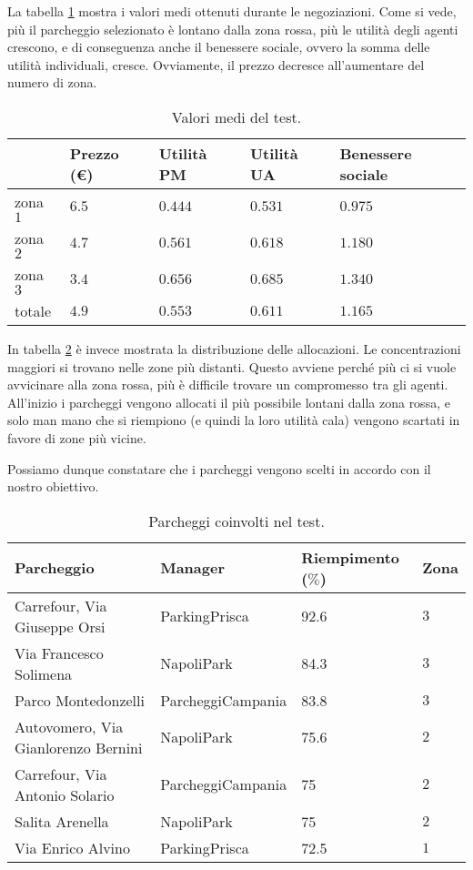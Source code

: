 \documentclass[11pt,a4paper,twoside]{article}
\numberwithin{figure}{section}
\numberwithin{equation}{section}
\begin{document}
La tabella \ref{tab:1} mostra i valori medi ottenuti durante le negoziazioni.
Come si vede, più il parcheggio selezionato è lontano dalla zona rossa, più le utilità degli agenti crescono, e di conseguenza anche il benessere sociale, ovvero la somma delle utilità individuali, cresce.
Ovviamente, il prezzo decresce all'aumentare del numero di zona.

\begin{table}[ht]
    \centering
    \begin{tabular}{lllll}
    \arrayrulecolor{gray}
    \toprule
    & Prezzo (€) & Utilità PM & Utilità UA & Benessere sociale \\
    \midrule
    zona $1$ & $6.5$ & $0.444$ & $0.531$ & $0.975$ \\
    zona $2$ & $4.7$ & $0.561$ & $0.618$ & $1.180$ \\
    zona $3$ & $3.4$ & $0.656$ & $0.685$ & $1.340$ \\
    \midrule
    totale & $4.9$ & $0.553$ & $0.611$ & $1.165$ \\
    \bottomrule
    \end{tabular}
    \caption{Valori medi del test.}
    \label{tab:1}
\end{table}

In tabella \ref{tab:2} è invece mostrata la distribuzione delle allocazioni.
Le concentrazioni maggiori si trovano nelle zone più distanti. Questo avviene perché più ci si vuole avvicinare alla zona rossa, più è difficile trovare un compromesso tra gli agenti. All'inizio i parcheggi vengono allocati il più possibile lontani dalla zona rossa, e solo man mano che si riempiono (e quindi la loro utilità cala) vengono scartati in favore di zone più vicine.

Possiamo dunque constatare che i parcheggi vengono scelti in accordo con il nostro obiettivo.

\begin{table}[ht]
    \centering
    \begin{tabular}{llll}
    \arrayrulecolor{gray}
    \toprule
    Parcheggio & Manager & Riempimento ($\%$) & Zona \\
    \midrule
    Carrefour, Via Giuseppe Orsi & \textsf{ParkingPrisca} & 92.6 & $3$ \\
    Via Francesco Solimena & \textsf{NapoliPark} & 84.3 & $3$ \\
    Parco Montedonzelli & \textsf{ParcheggiCampania} & 83.8 & $3$ \\
    Autovomero, Via Gianlorenzo Bernini & \textsf{NapoliPark} & 75.6 & $2$ \\
    Carrefour, Via Antonio Solario & \textsf{ParcheggiCampania} & 75 & $2$ \\
    Salita Arenella & \textsf{NapoliPark} & 75 & $2$ \\
    Via Enrico Alvino & \textsf{ParkingPrisca} & 72.5 & $1$ \\
    \bottomrule
    \end{tabular}
    \caption{Parcheggi coinvolti nel test.}
    \label{tab:2}
\end{table}
\vspace{-.4cm}
\end{document}
